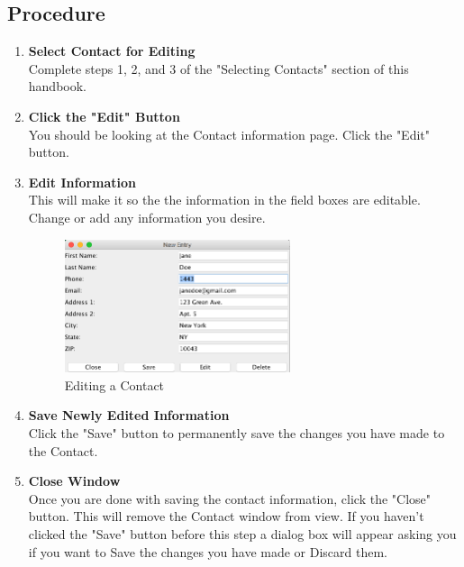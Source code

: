 \documentclass[a4paper, 11pt]{article}
\begin{document}
\subsection{Procedure}
\begin{enumerate}[label=\textbf{\arabic*})]
    \item{\textbf{Select Contact for Editing}}\\ Complete steps 1, 2, and 3 of the "Selecting Contacts" section of this handbook. 
    
    \item{\textbf{Click the "Edit" Button}}\\ You should be looking at the Contact information page. Click the "Edit" button.
    
    \item{\textbf{Edit Information}}\\ This will make it so the the information in the field boxes are editable. Change or add any information you desire. 
    
    \begin{figure}[h!]
    \centering
      \includegraphics[width=250]{edit_contact.png}
      \caption{Editing a Contact}
    \end{figure}
    
    \item{\textbf{Save Newly Edited Information}}\\ Click the "Save" button to permanently save the changes you have made to the Contact.
    
    \clearpage
    
    \item{\textbf{Close Window}}\\ Once you are done with saving the contact information, click the "Close" button. This will remove the Contact window from view. If you haven't clicked the "Save" button before this step a dialog box will appear asking you if you want to Save the changes you have made or Discard them.
    

\end{enumerate}
\end{document}
